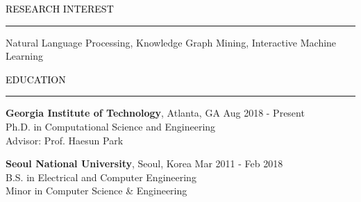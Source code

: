 \documentclass{resume} %
\renewenvironment{rSection}[1]{
	\sectionskip
	\textcolor{Black}{\MakeUppercase{#1}}
	\sectionlineskip
	\hrule
	\begin{list}{}{
			\setlength{\leftmargin}{1.5em}
		}
		\item[]
	}{
	\end{list}
}
\begin{document}
	
	\begin{rSection}{Research Interest}
		Natural Language Processing, Knowledge Graph Mining, Interactive Machine Learning\hfill
		\vspace{-2mm}
	\end{rSection}
	
	
	\vspace*{-2.0mm}
	\begin{rSection}{Education}
		\vspace{-1mm}		
		{\bf Georgia Institute of Technology}, Atlanta, GA \hfill { Aug 2018 - Present} 
		\\ Ph.D. in Computational Science and Engineering  
		\\ Advisor: Prof. Haesun Park\hfill
		
		\vspace*{-2.5mm}
		{\bf Seoul National University}, Seoul, Korea \hfill { Mar 2011 - Feb 2018} 
		\\ B.S. in Electrical and Computer Engineering \hfill
		\\ Minor in Computer Science \& Engineering \hfill
				
	\end{rSection}
\vspace*{-2.5mm}


\end{document}
